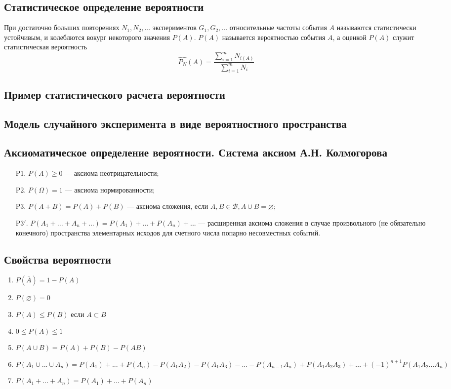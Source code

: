\documentclass[12pt]{article}
\begin{document}
\subsection{Статистическое определение вероятности}
При достаточно больших повторениях $N_1, N_2, ...$ экспериментов $G_1, G_2, ...$ относительные
частоты события $A$ называются статистически устойчивым, и колеблются вокург некоторого значения $P(A)$.
$P(A)$ называется вероятностью события $A$, а оценкой $P(A)$ служит статистическая вероятность
\[\widehat{P_N}(A) = \frac{\sum^m_{i=1}N_{i(A)}}{\sum^m_{i=1}N_i}\]

\subsection{Пример статистического расчета вероятности}

\subsection{Модель случайного эксперимента в виде вероятностного пространства}

\subsection{Аксиоматическое определение вероятности. Система аксиом А.Н. Колмогорова}
\begin{itemize}
	\item[P1.] $P(A) \geq 0$ --- аксиома неотрицательности;
	\item[P2.] $P(\Omega) = 1$ --- аксиома нормированности;
	\item[P3.] $P(A + B) = P(A) + P(B)$ --- аксиома сложения, если
		$A, B \in \mathcal{B}, A \cup B = \varnothing$;
	\item[P3$'$.] $P(A_1 + ... + A_n + ...) = P(A_1) + ... + P(A_n) + ...$ ---
		расширенная аксиома сложения в случае произвольного (не обязательно конечного)
		пространства элементарных исходов для счетного числа попарно несовместных событий.
\end{itemize}

\subsection{Свойства вероятности}
\begin{enumerate} %
	\item $P(\overline{A}) = 1 - P(A)$
	\item $P(\varnothing) = 0$
	\item $P(A) \leq P(B)$ если $A \subset B$
	\item $0 \leq P(A) \leq 1$
	\item $P(A \cup B) = P(A) + P(B) - P(AB)$
	\item $P(A_1 \cup ... \cup A_n) = P(A_1) + ... + P(A_n) - P(A_1A_2) - P(A_1A_3) - ... - P(A_{n-1}A_n) + P(A_1A_2A_3) + ... + (-1)^{n+1}P(A_1A_2...A_n)$
	\item $P(A_1 + ... + A_n) = P(A_1) + ... + P(A_n)$
\end{enumerate}
\end{document}
